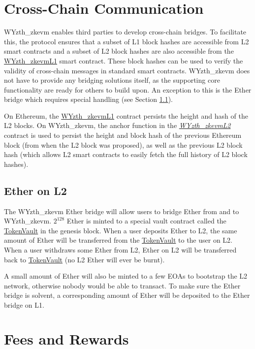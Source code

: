 \documentclass[9pt,oneside]{amsart}
\begin{document}
\begin{multicols}{2}
\section{Cross-Chain Communication}\label{sec:bridges}
WYzth_zkevm enables third parties to develop cross-chain bridges. To facilitate this, the protocol ensures that a subset of L1 block hashes are accessible from L2 smart contracts and a subset of  L2 block hashes are also accessible from the \underline{WYzth_zkevmL1} smart contract. These block hashes can be used to verify the validity of cross-chain messages in standard smart contracts. WYzth_zkevm does not have to provide any bridging solutions itself, as the supporting core functionality are ready for others to build upon. An exception to this is the Ether bridge which requires special handling (see Section \ref{eth-bridge}). 

On Ethereum, the \underline{WYzth_zkevmL1} contract persists the height and hash of the L2 blocks. On WYzth_zkevm, the anchor function in the \emph{\underline{WYzth_zkevmL2}} contract is used to persist the height and block hash of the previous Ethereum block (from when the L2 block was proposed), as well as the previous L2 block hash (which allows L2 smart contracts to easily fetch the full history of L2 block hashes).

\subsection{Ether on L2}
\label{eth-bridge}
The WYzth_zkevm Ether bridge will allow users to bridge Ether from and to WYzth_zkevm. $2^{128}$ Ether is minted to a special vault contract called the \underline{TokenVault} in the genesis block. When a user deposits Ether to L2, the same amount of Ether will be transferred from the \underline{TokenVault} to the user on L2. When a user withdraws some Ether from L2, Ether on L2 will be transferred back to \underline{TokenVault} (no L2 Ether will ever be burnt).

A small amount of Ether will also be minted to a few EOAs to bootstrap the L2 network, otherwise nobody would be able to transact. To make sure the Ether bridge is solvent, a corresponding amount of Ether will be deposited to the Ether bridge on L1.

\section{Fees and Rewards}\label{sec:tokenomics}


\end{multicols}
\end{document}
